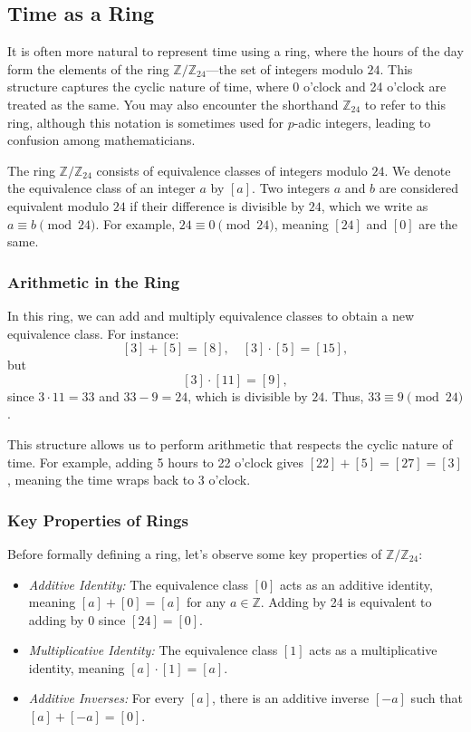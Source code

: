 \subsection{Time as a Ring}

It is often more natural to represent time using a ring, where the hours of the day form the elements of the ring $\mathbb{Z}/\mathbb{Z}_{24}$—the set of integers modulo $24$. This structure captures the cyclic nature of time, where 0 o’clock and 24 o’clock are treated as the same. You may also encounter the shorthand $\mathbb{Z}_{24}$ to refer to this ring, although this notation is sometimes used for $p$-adic integers, leading to confusion among mathematicians.

The ring $\mathbb{Z}/\mathbb{Z}_{24}$ consists of equivalence classes of integers modulo $24$. We denote the equivalence class of an integer \( a \) by \([a]\). Two integers \( a \) and \( b \) are considered equivalent modulo $24$ if their difference is divisible by $24$, which we write as \( a \equiv b \pmod{24} \). For example, \( 24 \equiv 0 \pmod{24} \), meaning $[24]$ and $[0]$ are the same.

\subsubsection*{Arithmetic in the Ring}

In this ring, we can add and multiply equivalence classes to obtain a new equivalence class. For instance:
$$[3] + [5] = [8], \quad [3] \cdot [5] = [15],$$
but
$$[3] \cdot [11] = [9],$$
since $3 \cdot 11 = 33$ and $33 - 9 = 24$, which is divisible by $24$. Thus, $33 \equiv 9 \pmod{24}$.

This structure allows us to perform arithmetic that respects the cyclic nature of time. For example, adding 5 hours to 22 o’clock gives $[22] + [5] = [27] = [3]$, meaning the time wraps back to 3 o’clock.

\subsubsection*{Key Properties of Rings}

Before formally defining a ring, let’s observe some key properties of $\mathbb{Z}/\mathbb{Z}_{24}$:

\begin{itemize}
    \item \emph{Additive Identity:} The equivalence class $[0]$ acts as an additive identity, meaning \([a] + [0] = [a]\) for any \( a \in \mathbb{Z} \). Adding by 24 is equivalent to adding by 0 since $[24] = [0]$.
    \item \emph{Multiplicative Identity:} The equivalence class \([1]\) acts as a multiplicative identity, meaning \([a] \cdot [1] = [a]\). 
    \item \emph{Additive Inverses:} For every \([a]\), there is an additive inverse \([-a]\) such that \([a] + [-a] = [0]\).
\end{itemize}

